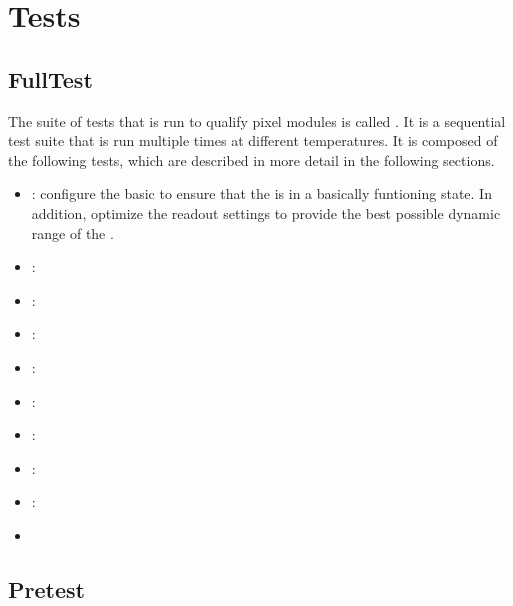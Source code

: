 \section{Tests}
\label{s:tests}


\subsection{FullTest}
\label{ss:fulltest}

The suite of tests that is run to qualify pixel modules is called
\fulltest. It is a sequential test suite that is run multiple times at
different temperatures. It is composed of the following tests, which
are described in more detail in the following sections.
\begin{itemize}
  \item \pretest: configure the basic \dacs to ensure that the \roc is
    in a basically funtioning state. In addition, optimize the readout
    settings to provide the best possible dynamic range of the \ph. 
  \item \alivetest: 
  \item \masktest:
  \item \bbtest:
  \item \trimbits:
  \item \trimming:
  \item \scurves:
  \item \thrMaps:
  \item \phcalibration:
  \item \hrmaps
\end{itemize}


\subsection{Pretest}
\label{ss:pretest}